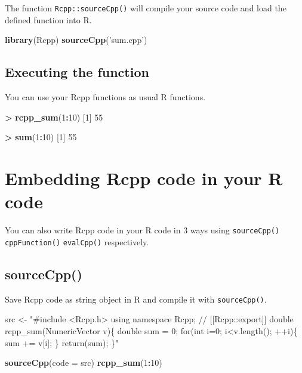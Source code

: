 \documentclass[
]{book}
\newenvironment{Shaded}{\begin{snugshade}}{\end{snugshade}}
\newcommand{\DataTypeTok}[1]{\textcolor[rgb]{0.13,0.29,0.53}{#1}}
\newcommand{\DecValTok}[1]{\textcolor[rgb]{0.00,0.00,0.81}{#1}}
\newcommand{\KeywordTok}[1]{\textcolor[rgb]{0.13,0.29,0.53}{\textbf{#1}}}
\newcommand{\NormalTok}[1]{#1}
\newcommand{\OperatorTok}[1]{\textcolor[rgb]{0.81,0.36,0.00}{\textbf{#1}}}
\newcommand{\StringTok}[1]{\textcolor[rgb]{0.31,0.60,0.02}{#1}}
\begin{document}
The function \texttt{Rcpp::sourceCpp()} will compile your source code and load the defined function into R.

\begin{Shaded}
\begin{Highlighting}[]
\KeywordTok{library}\NormalTok{(Rcpp)}
\KeywordTok{sourceCpp}\NormalTok{(}\StringTok{'sum.cpp'}\NormalTok{)}
\end{Highlighting}
\end{Shaded}

\hypertarget{executing-the-function}{%
\section{Executing the function}\label{executing-the-function}}

You can use your Rcpp functions as usual R functions.

\begin{Shaded}
\begin{Highlighting}[]
\OperatorTok{>}\StringTok{ }\KeywordTok{rcpp_sum}\NormalTok{(}\DecValTok{1}\OperatorTok{:}\DecValTok{10}\NormalTok{)}
\NormalTok{[}\DecValTok{1}\NormalTok{] }\DecValTok{55}

\OperatorTok{>}\StringTok{ }\KeywordTok{sum}\NormalTok{(}\DecValTok{1}\OperatorTok{:}\DecValTok{10}\NormalTok{)}
\NormalTok{[}\DecValTok{1}\NormalTok{] }\DecValTok{55}
\end{Highlighting}
\end{Shaded}

\hypertarget{embedding-rcpp-code-in-your-r-code}{%
\chapter{Embedding Rcpp code in your R code}\label{embedding-rcpp-code-in-your-r-code}}

You can also write Rcpp code in your R code in 3 ways using \texttt{sourceCpp()} \texttt{cppFunction()} \texttt{evalCpp()} respectively.

\hypertarget{sourcecpp}{%
\section{sourceCpp()}\label{sourcecpp}}

Save Rcpp code as string object in R and compile it with \texttt{sourceCpp()}.

\begin{Shaded}
\begin{Highlighting}[]
\NormalTok{src <-}
\StringTok{"#include <Rcpp.h>}
\StringTok{using namespace Rcpp;}
\StringTok{// [[Rcpp::export]]}
\StringTok{double rcpp_sum(NumericVector v)\{}
\StringTok{  double sum = 0;}
\StringTok{  for(int i=0; i<v.length(); ++i)\{}
\StringTok{    sum += v[i];}
\StringTok{  \}}
\StringTok{  return(sum);}
\StringTok{\}"}

\KeywordTok{sourceCpp}\NormalTok{(}\DataTypeTok{code =}\NormalTok{ src)}
\KeywordTok{rcpp_sum}\NormalTok{(}\DecValTok{1}\OperatorTok{:}\DecValTok{10}\NormalTok{)}
\end{Highlighting}
\end{Shaded}
\end{document}
